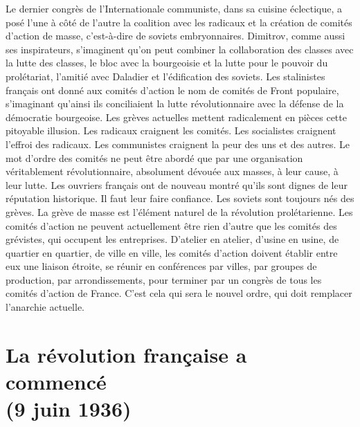 \documentclass[french,twoside]{book} %
\newcommand\chapteropen{} %
\newcommand\chapterclose{} %
\begin{document}
Le dernier congrès de l’Internationale communiste, dans sa cuisine éclectique, a posé l’une à côté de l’autre la coalition avec les radicaux et la création de comités d’action de masse, c’est-à-dire de soviets embryonnaires. Dimitrov, comme aussi ses inspirateurs, s’imaginent qu’on peut combiner la collaboration des classes avec la lutte des classes, le bloc avec la bourgeoisie et la lutte pour le pouvoir du prolétariat, l’amitié avec Daladier et l’édification des soviets. Les stalinistes français ont donné aux comités d’action le nom de comités de Front populaire, s’imaginant qu’ainsi ils conciliaient la lutte révolutionnaire avec la défense de la démocratie bourgeoise. Les grèves actuelles mettent radicalement en pièces cette pitoyable illusion. Les radicaux craignent les comités. Les socialistes craignent l’effroi des radicaux. Les communistes craignent la peur des uns et des autres. Le mot d’ordre des comités ne peut être abordé que par une organisation véritablement révolutionnaire, absolument dévouée aux masses, à leur cause, à leur lutte. Les ouvriers français ont de nouveau montré qu’ils sont dignes de leur réputation historique. Il faut leur faire confiance. Les soviets sont toujours nés des grèves. La grève de masse est l’élément naturel de la révolution prolétarienne. Les comités d’action ne peuvent actuellement être rien d’autre que les comités des grévistes, qui occupent les entreprises. D’atelier en atelier, d’usine en usine, de quartier en quartier, de ville en ville, les comités d’action doivent établir entre eux une liaison étroite, se réunir en conférences par villes, par groupes de production, par arrondissements, pour terminer par un congrès de tous les comités d’action de France. C’est cela qui sera le nouvel ordre, qui doit remplacer l’anarchie actuelle.
\chapterclose


\chapteropen
 \chapter[{La révolution française a commencé, (9 juin 1936)}]{La révolution française a commencé \\
(9 juin 1936)}
\label{p7}\renewcommand{\leftmark}{La révolution française a commencé \\
(9 juin 1936)}
\end{document}
